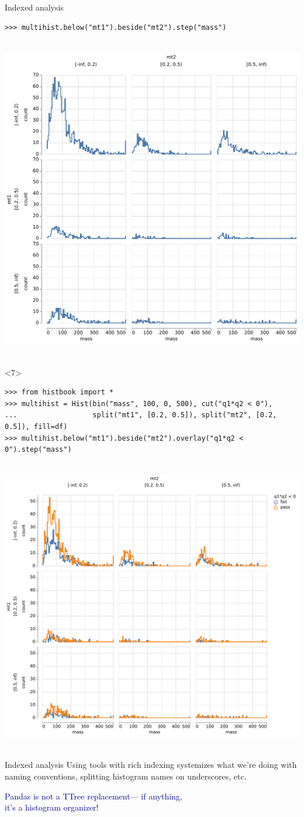 \documentclass[aspectratio=169]{beamer}
\begin{document}
\begin{frame}[fragile]{Indexed analysis}
\begin{onlyenv}
\begin{verbatim}
>>> multihist.below("mt1").beside("mt2").step("mass")
\end{verbatim}
\mbox{ } \hfill \includegraphics[height=7 cm]{pandhist_double_trellis.pdf} \hfill \mbox{ }
\end{onlyenv}
\begin{onlyenv}<7>
\scriptsize
\begin{verbatim}
>>> from histbook import *
>>> multihist = Hist(bin("mass", 100, 0, 500), cut("q1*q2 < 0"),
...                  split("mt1", [0.2, 0.5]), split("mt2", [0.2, 0.5]), fill=df)
>>> multihist.below("mt1").beside("mt2").overlay("q1*q2 < 0").step("mass")
\end{verbatim}
\mbox{ } \hfill \includegraphics[height=7 cm]{pandhist_double_trellis_overlay.pdf} \hfill \mbox{ }
\end{onlyenv}
\end{frame}

\begin{frame}{Indexed analysis}
\Large
\vspace{0.5 cm}
Using tools with rich indexing systemizes what we're doing with naming conventions, splitting histogram names on underscores, etc.

\vspace{1 cm}
\begin{center}
\textcolor{darkblue}{Pandas is not a TTree replacement--- if anything,\\it's a histogram organizer!}
\end{center}

\vspace{1 cm}
\end{frame}
\end{document}
